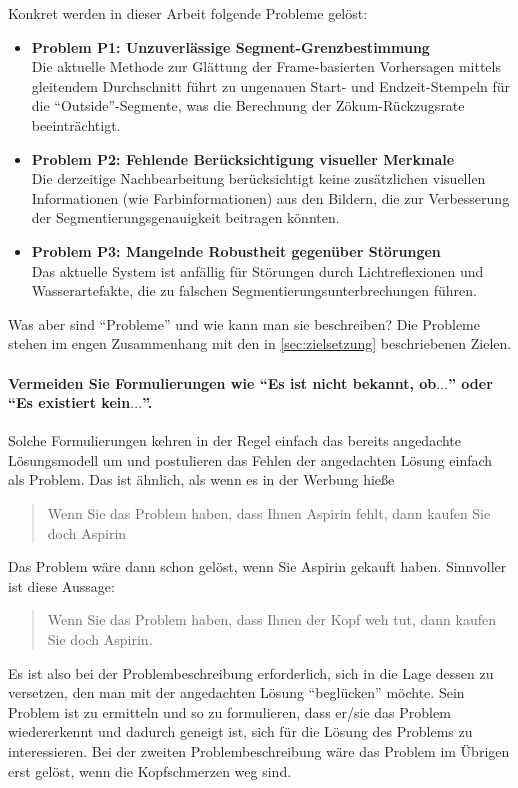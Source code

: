 Konkret werden in dieser Arbeit folgende Probleme gelöst:

\begin{itemize}
\item \textbf{Problem P1: Unzuverlässige Segment-Grenzbestimmung} \\
Die aktuelle Methode zur Glättung der Frame-basierten Vorhersagen mittels gleitendem Durchschnitt führt zu ungenauen Start- und Endzeit-Stempeln für die \enquote{Outside}-Segmente, was die Berechnung der Zökum-Rückzugsrate beeinträchtigt.

\item \textbf{Problem P2: Fehlende Berücksichtigung visueller Merkmale} \\
Die derzeitige Nachbearbeitung berücksichtigt keine zusätzlichen visuellen Informationen (wie Farbinformationen) aus den Bildern, die zur Verbesserung der Segmentierungsgenauigkeit beitragen könnten.

\item \textbf{Problem P3: Mangelnde Robustheit gegenüber Störungen} \\
Das aktuelle System ist anfällig für Störungen durch Lichtreflexionen und Wasserartefakte, die zu falschen Segmentierungsunterbrechungen führen.
\end{itemize}

Was aber sind \enquote{Probleme} und wie kann man sie beschreiben?
Die Probleme stehen im engen Zusammenhang mit den in \cref{sec:zielsetzung} beschriebenen Zielen.

\paragraph{Vermeiden Sie Formulierungen wie \enquote{Es ist nicht bekannt, ob$\ldots$} oder \enquote{Es existiert kein$\ldots$}.}
Solche Formulierungen kehren in der Regel einfach das bereits angedachte Lösungsmodell um und postulieren das Fehlen der angedachten Lösung einfach als Problem.
Das ist ähnlich, als wenn es in der Werbung hieße \blockquote{Wenn Sie das Problem haben, dass Ihnen Aspirin fehlt, dann kaufen Sie doch Aspirin}.
Das Problem wäre dann schon gelöst, wenn Sie Aspirin gekauft haben.
Sinnvoller ist diese Aussage:
\blockquote{Wenn Sie das Problem haben, dass Ihnen der Kopf weh tut, dann kaufen Sie doch Aspirin.}
Es ist also bei der Problembeschreibung erforderlich, sich in die Lage dessen zu versetzen, den man mit der angedachten Lösung \enquote{beglücken} möchte.
Sein Problem ist zu ermitteln und so zu formulieren, dass er/sie das Problem wiedererkennt und dadurch geneigt ist, sich für die Lösung des Problems zu interessieren.
Bei der zweiten Problembeschreibung wäre das Problem im Übrigen erst gelöst, wenn die Kopfschmerzen weg sind.


